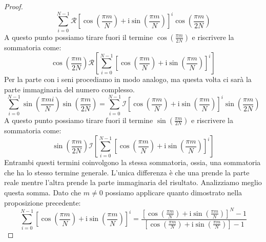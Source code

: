 \begin{proposizione}
\begin{proof}
\begin{equation*}
            \sum_{i = 0}^{N - 1} \mathcal{R} \left[\cos\left(\frac{\pi m}{N}\right) +
                \text{i} \sin\left(\frac{\pi m}{N}\right)\right]^i \cos\left(\frac{\pi m}{2N}\right)
        \end{equation*}
        A questo punto possiamo tirare fuori il termine $\cos\left(\frac{\pi m}{2N}\right)$
        e riscrivere la sommatoria come:
        \begin{equation*}
            \cos\left(\frac{\pi m}{2N}\right) \mathcal{R} \left[\sum_{i = 0}^{N - 1}\left[ \cos\left(\frac{\pi m}{N}\right) +
                    \text{i} \sin\left(\frac{\pi m}{N}\right)\right]^i\right]
        \end{equation*}
        Per la parte con i seni procediamo in modo analogo, ma questa volta ci
        sarà la parte immaginaria del numero complesso.
        \begin{equation*}
            \sum_{i=0}^{N-1} \sin\left(\frac{\pi mi}{N}\right)\sin\left(\frac{\pi m}{2N}\right) =
            \sum_{i = 0}^{N - 1} \mathcal{I} \left[\cos\left(\frac{\pi m}{N}\right) +
                \text{i} \sin\left(\frac{\pi m}{N}\right)\right]^i \sin\left(\frac{\pi m}{2N}\right)
        \end{equation*}
        A questo punto possiamo tirare fuori il termine $\sin\left(\frac{\pi m}{2N}\right)$
        e riscrivere la sommatoria come:
        \begin{equation*}
            \sin\left(\frac{\pi m}{2N}\right) \mathcal{I} \left[\sum_{i = 0}^{N - 1} \left[\cos\left(\frac{\pi m}{N}\right) +
                    \text{i} \sin\left(\frac{\pi m}{N}\right)\right]^i\right]
        \end{equation*}
        Entrambi questi termini coinvolgono la stessa sommatoria, ossia, una
        sommatoria che ha lo stesso termine generale. L'unica differenza è che
        una prende la parte reale mentre l'altra prende la parte immaginaria del
        risultato. Analizziamo meglio questa somma. Dato che $m \neq 0$ possiamo
        applicare quanto dimostrato nella proposizione precedente:
        \begin{equation*}
            \sum_{i = 0}^{N - 1} \left[\cos\left(\frac{\pi m}{N}\right) + \text{i}
                \sin\left(\frac{\pi m}{N}\right)\right]^i =
            \frac{\left[\cos\left(\frac{\pi m}{N}\right) + \text{i} \sin\left(
                    \frac{\pi m}{N}\right)\right]^N - 1}{\left[\cos\left(\frac{\pi m}{N}\right)
                    + \text{i} \sin\left(\frac{\pi m}{N}\right)\right] - 1}
        \end{equation*}

\end{proof}
\end{proposizione}

